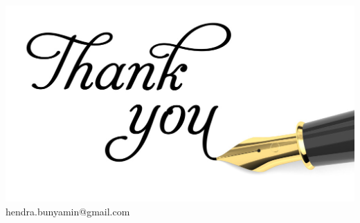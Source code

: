 \documentclass{beamer}
\theoremstyle{mystyle}
\begin{document}


\begin{frame}[plain]
		\centering\includegraphics[scale=1]{thank-you}	
		hendra.bunyamin@gmail.com
\end{frame}
\end{document}
